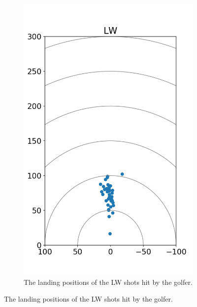 \documentclass{kththesis}
\begin{document}
\begin{figure}
\begin{subfigure}{0.4\textwidth}
    \includegraphics[height=0.4\textheight]{Shots/LW_shots.png} 
    \caption{The landing positions of the LW shots hit by the golfer.}
    \label{fig:LW_shots}
    \end{subfigure}
\end{figure}
\end{document}
